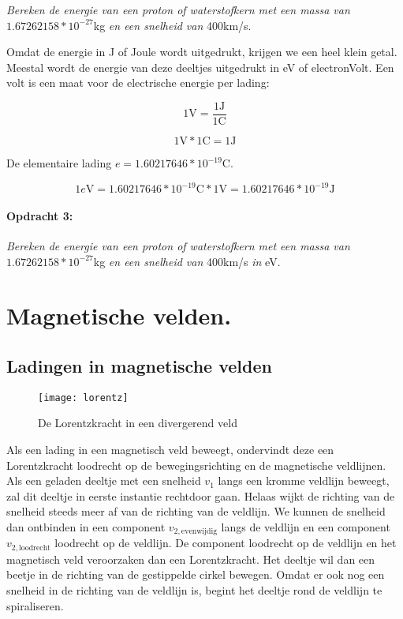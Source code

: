 \emph{Bereken de energie van een proton of waterstofkern met een massa
van} $1.67262158*10^{-27}$kg \emph{en een snelheid van} 400km/s.

Omdat de energie in J of Joule wordt uitgedrukt, krijgen we een heel
klein getal. Meestal wordt de energie van deze deeltjes uitgedrukt
in eV of electronVolt. Een volt is een maat voor de electrische energie
per lading:

\begin{equation}
1\mathrm{V}=\frac{1\mathrm{J}}{1\mathrm{C}}
\end{equation}


\begin{equation}
1\mathrm{V}*1\mathrm{C}=1\mathrm{J}
\end{equation}


De elementaire lading $e=1.60217646*10^{-19}$C. 

\begin{equation}
1e\mathrm{V}=1.60217646*10^{-19}\mathrm{C*1V}=1.60217646*10^{-19}\mathrm{J}
\end{equation}


\paragraph*{Opdracht 3:}

\emph{Bereken de energie van een proton of waterstofkern met een massa
van} $1.67262158*10^{-27}$kg \emph{en een snelheid van} 400km/s \emph{in}
eV.


\section{Magnetische velden.}


\subsection{Ladingen in magnetische velden}

\begin{figure}[h]
\noindent \begin{centering}
\texttt{[image: lorentz]}
\par\end{centering}

\caption{De Lorentzkracht in een divergerend veld}
\end{figure}


Als een lading in een magnetisch veld beweegt, ondervindt deze een
Lorentzkracht loodrecht op de bewegingsrichting en de magnetische
veldlijnen. Als een geladen deeltje met een snelheid $v_{1}$ langs
een kromme veldlijn beweegt, zal dit deeltje in eerste instantie rechtdoor
gaan. Helaas wijkt de richting van de snelheid steeds meer af van
de richting van de veldlijn. We kunnen de snelheid dan ontbinden in
een component $v_{2,\mathrm{evenwijdig}}$ langs de veldlijn en een
component $v_{2,\mathrm{loodrecht}}$ loodrecht op de veldlijn. De
component loodrecht op de veldlijn en het magnetisch veld veroorzaken
dan een Lorentzkracht. Het deeltje wil dan een beetje in de richting
van de gestippelde cirkel bewegen. Omdat er ook nog een snelheid in
de richting van de veldlijn is, begint het deeltje rond de veldlijn
te spiraliseren.


